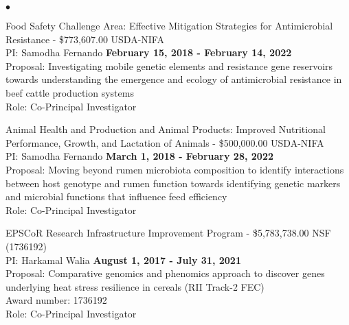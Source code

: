 \documentclass[margin,line,10pt]{res}
\newenvironment{list2}{
  \begin{list}{$\bullet$}{%
      \setlength{\itemsep}{0in}
      \setlength{\parsep}{0in} \setlength{\parskip}{0in}
      \setlength{\topsep}{0in} \setlength{\partopsep}{0in} 
      \setlength{\leftmargin}{0.2in}}}{\end{list}}
\begin{document}
\begin{resume}
\begin{list2}
\item Food Safety Challenge Area: Effective Mitigation Strategies for Antimicrobial Resistance  - \$773,607.00  \hfill USDA-NIFA\\
PI: Samodha Fernando   \hfill \textbf{February 15, 2018 - February 14, 2022}\\
Proposal: Investigating mobile genetic elements and resistance gene reservoirs towards understanding the emergence and ecology of antimicrobial resistance in beef cattle production systems  \\
Role: Co-Principal Investigator \\

\vspace{0.5cm}

\item Animal Health and Production and Animal Products: Improved Nutritional Performance, Growth, and Lactation of Animals  - \$500,000.00  \hfill USDA-NIFA\\
PI: Samodha Fernando   \hfill \textbf{March 1, 2018 - February 28, 2022}\\
Proposal: Moving beyond rumen microbiota composition to identify interactions between host genotype and rumen function towards identifying genetic markers and microbial functions that influence feed efficiency  \\
Role: Co-Principal Investigator \\

\vspace{0.5cm}





\vspace{0.5cm}
  
\item EPSCoR Research Infrastructure Improvement Program - \$5,783,738.00   \hfill NSF (1736192) \\
PI: Harkamal Walia   \hfill \textbf{August 1, 2017 - July 31, 2021}\\
Proposal:  Comparative genomics and phenomics approach to discover genes underlying heat stress resilience in cereals  (RII Track-2 FEC)  \\
Award number: 1736192 \\
Role: Co-Principal Investigator \\


\end{list2}
\end{resume}
\end{document}
